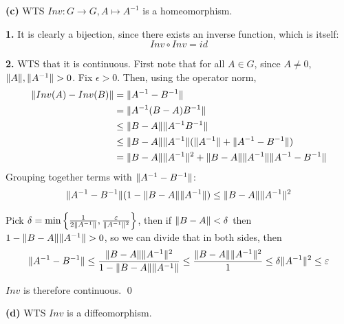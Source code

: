 \documentclass[a4paper, 12pt]{article}
\begin{document}
\begin{solution}
    \textbf{(c)} WTS $Inv: G \to G, A \mapsto A^{-1}$ is a homeomorphism.

    \textbf{1.} It is clearly a bijection, since there exists an inverse function, which is itself: \[
        Inv \circ Inv = id
    \]

    \textbf{2.} WTS that it is continuous. First note that for all $A \in G$, since $A \neq 0$, $\lVert A\rVert, \lVert A^{-1}\rVert > 0$. Fix $\epsilon > 0$. Then, using the operator norm,
    \begin{align*}
        \lVert Inv(A) - Inv(B)\rVert & = \lVert A^{-1} - B^{-1}\rVert                                                     \\
                               & = \lVert A^{-1}(B - A)B^{-1}\rVert                                                 \\
                               & \leq \lVert B - A\rVert \lVert A^{-1}B^{-1}\rVert                                        \\
                               & \leq \lVert B-A\rVert \lVert A^{-1}\rVert (\lVert A^{-1}\rVert + \lVert A^{-1} - B^{-1}\rVert)       \\
                               & = \lVert B-A\rVert \lVert A^{-1}\rVert^2 + \lVert B-A\rVert\lVert A^{-1}\rVert\lVert A^{-1} - B^{-1}\rVert
    \end{align*}
    Grouping together terms with $\lVert A^{-1} - B^{-1}\rVert$:
    \begin{equation*}
        \lVert A^{-1} - B^{-1}\rVert (1 - \lVert B-A\rVert\lVert A^{-1}\rVert)\leq \lVert B-A\rVert \lVert A^{-1}\rVert^2
    \end{equation*}

    Pick $\delta = \min \left\{ \frac{1}{2\lVert A^{-1}\rVert}, \frac{\varepsilon}{\lVert A^{-1}\rVert^2} \right\}$, then if $\lVert B-A\rVert < \delta$ then $1 - \lVert B-A\rVert\lVert A^{-1}\rVert > 0$, so we can divide that in both sides, then \[
        \lVert A^{-1} - B^{-1}\rVert \leq \frac{\lVert B-A\rVert \lVert A^{-1}\rVert^2}{1 - \lVert B-A\rVert \lVert A^{-1}\rVert} \leq \frac{\lVert B-A\rVert \lVert A^{-1}\rVert^2}{1} \leq \delta \lVert A^{-1}\rVert^2 \leq \varepsilon
    \]

    $Inv$ is therefore continuous. \qed

    \textbf{(d)} WTS $Inv$ is a diffeomorphism.


\end{solution}
\end{document}
